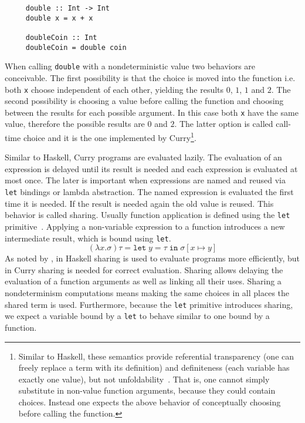 \begin{verbatim}
     double :: Int -> Int
     double x = x + x
     
     doubleCoin :: Int
     doubleCoin = double coin
\end{verbatim}
When calling \texttt{double} with a nondeterministic value two behaviors are
conceivable.
The first possibility is that the choice is moved into the function i.e. both
\texttt{x} choose independent of each other, yielding the results $0$, $1$, $1$
and $2$.
The second possibility is choosing a value before calling the function and
choosing between the results for each possible argument.
In this case both \texttt{x} have the same value, therefore the possible results
are $0$ and $2$.
The latter option is called call-time choice and it is the one implemented by
Curry\footnote{
Similar to Haskell, these semantics provide referential transparency (one
can freely replace a term with its definition) and definiteness (each variable has
exactly one value), but not unfoldability~\cite{DBLP:journals/acta/SondergaardS89}.
That is, one cannot simply substitute in non-value function arguments, because
they could contain choices.
Instead one expects the above behavior of conceptually choosing before calling
the function.}.

Similar to Haskell, Curry programs are evaluated lazily.
The evaluation of an expression is delayed until its result is needed and each
expression is evaluated at most once.
The later is important when expressions are named and reused via \texttt{let}
bindings or lambda abstraction.
The named expression is evaluated the first time it is needed.
If the result is needed again the old value is reused.
This behavior is called sharing.
Usually function application is defined using the \texttt{let}
primitive~\cite{DBLP:conf/popl/Launchbury93}.
Applying a non-variable expression to a function introduces a new intermediate
result, which is bound using \texttt{let}.
$$
(\lambda x.\sigma) \tau = \texttt{let}\;y = \tau\;\texttt{in}\;\sigma[x\mapsto y]
$$
As noted by \textcite{DBLP:journals/corr/abs-2008-11999}, in Haskell sharing is
used to evaluate programs more efficiently, but in Curry sharing is needed for
correct evaluation.
Sharing allows delaying the evaluation of a function arguments as well as
linking all their uses.
Sharing a nondeterminism computations means making the same choices in all
places the shared term is used.
Furthermore, because the \texttt{let} primitive introduces sharing, we expect a
variable bound by a \texttt{let} to behave similar to one bound by a function.

